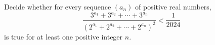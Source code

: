 Decide whether for every sequence $(a_n)$ of positive real numbers,
\[ \frac{3^{a_1} + 3^{a_2} + \cdots + 3^{a_n}}{\left(2^{a_1} + 2^{a_2} + \cdots + 2^{a_n}\right)^2} < \frac{1}{2024} \]
is true for at least one positive integer $n$.
